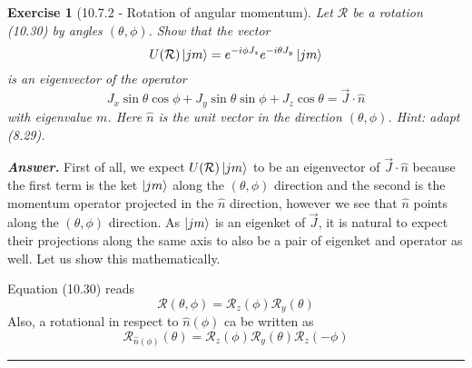 \documentclass[12pt]{article}
\def\be{\begin{equation}}
\def\ee{\end{equation}}
\newtheorem{exercise}{Exercise}
\newenvironment{answer}{\noindent\textbf{\textit{Answer.}} \normalfont }{\par\noindent\rule{\textwidth}{0.4pt}}
\begin{document}
	
	\begin{exercise}[10.7.2 - Rotation of angular momentum]
		Let $\mathcal{R}$ be a rotation (10.30) by angles $(\theta, \phi)$. Show that the vector
		\be
			U(\mathcal{R})\ket{jm} = e^{-i\phi J_z}e^{-i\theta J_y}\ket{jm}
		\ee
		is an eigenvector of the operator
		\be
			J_x \sin\theta \cos\phi + J_y \sin\theta\sin\phi + J_z \cos\theta = \vec{J}\cdot\hat{n}
		\ee
		with eigenvalue $m$. Here $\hat{n}$ is the unit vector in the direction $(\theta, \phi)$. Hint: adapt (8.29).		
	\end{exercise}
	\begin{answer}
		First of all, we expect $U(\mathcal{R})\ket{jm}$ to be an eigenvector of $\vec{J}\cdot\hat{n}$ because the first term is the ket $\ket{jm}$ along the $(\theta, \phi)$ direction and the second is the momentum operator projected in the $\hat{n}$ direction, however we see that $\hat{n}$ points along the $(\theta, \phi)$ direction. As $\ket{jm}$ is an eigenket of $\vec{J}$, it is natural to expect their projections along the same axis to also be a pair of eigenket and operator as well. Let us show this mathematically.
		
		Equation (10.30) reads
		\be
			\mathcal{R}(\theta, \phi) = \mathcal{R}_z(\phi)\mathcal{R}_y(\theta)
		\ee
		Also, a rotational in respect to $\hat{n}(\phi)$ ca be written as
		\be
			\mathcal{R}_{\hat{n}(\phi)}(\theta) = \mathcal{R}_z(\phi)\mathcal{R}_y(\theta)\mathcal{R}_z(-\phi)
		\ee
	\end{answer}
	
	
\end{document}
